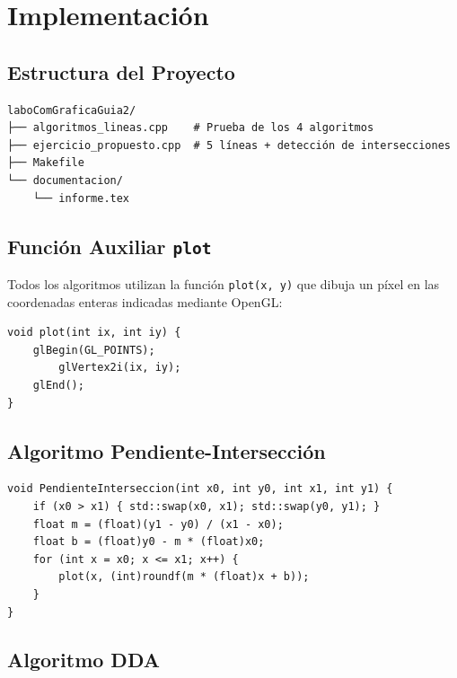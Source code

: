 \documentclass[12pt,a4paper]{article}
\begin{document}
\section{Implementación}

\subsection{Estructura del Proyecto}

\begin{verbatim}
laboComGraficaGuia2/
├── algoritmos_lineas.cpp    # Prueba de los 4 algoritmos
├── ejercicio_propuesto.cpp  # 5 líneas + detección de intersecciones
├── Makefile
└── documentacion/
    └── informe.tex
\end{verbatim}

\subsection{Función Auxiliar \texttt{plot}}

Todos los algoritmos utilizan la función \texttt{plot(x, y)} que dibuja un
píxel en las coordenadas enteras indicadas mediante OpenGL:

\begin{lstlisting}[caption={Función plot en OpenGL}]
void plot(int ix, int iy) {
    glBegin(GL_POINTS);
        glVertex2i(ix, iy);
    glEnd();
}
\end{lstlisting}

\subsection{Algoritmo Pendiente-Intersección}

\begin{lstlisting}[caption={Implementación Pendiente-Intersección}]
void PendienteInterseccion(int x0, int y0, int x1, int y1) {
    if (x0 > x1) { std::swap(x0, x1); std::swap(y0, y1); }
    float m = (float)(y1 - y0) / (x1 - x0);
    float b = (float)y0 - m * (float)x0;
    for (int x = x0; x <= x1; x++) {
        plot(x, (int)roundf(m * (float)x + b));
    }
}
\end{lstlisting}

\subsection{Algoritmo DDA}
\end{document}
